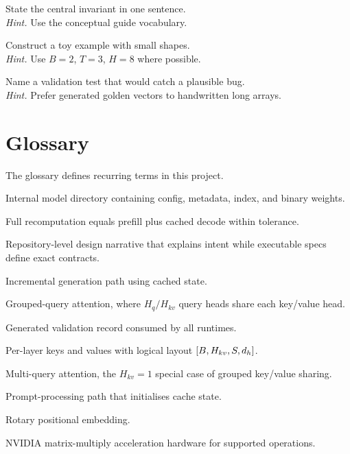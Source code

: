 \begin{chapterexercises}
\item State the central invariant in one sentence.\\
\textit{Hint.} Use the conceptual guide vocabulary.
\item Construct a toy example with small shapes.\\
\textit{Hint.} Use $B=2$, $T=3$, $H=8$ where possible.
\item Name a validation test that would catch a plausible bug.\\
\textit{Hint.} Prefer generated golden vectors to handwritten long arrays.
\end{chapterexercises}

\chapter{Glossary}
\label{app:glossary}
The glossary defines recurring terms in this project.


\begin{description}[leftmargin=!,labelwidth=28mm]
\item[Artifact] Internal model directory containing config, metadata, index, and binary weights.
\item[Cache equivalence] Full recomputation equals prefill plus cached decode within tolerance.
\item[Conceptual guide] Repository-level design narrative that explains intent while executable specs define exact contracts.
\item[Decode] Incremental generation path using cached state.
\item[GQA] Grouped-query attention, where \(H_q/H_{kv}\) query heads share each key/value head.
\item[Golden vector] Generated validation record consumed by all runtimes.
\item[KV cache] Per-layer keys and values with logical layout \(\left[B,H_{kv},S,d_h\right]\).
\item[MQA] Multi-query attention, the \(H_{kv}=1\) special case of grouped key/value sharing.
\item[Prefill] Prompt-processing path that initialises cache state.
\item[RoPE] Rotary positional embedding.
\item[Tensor Core] NVIDIA matrix-multiply acceleration hardware for supported operations.
\end{description}


